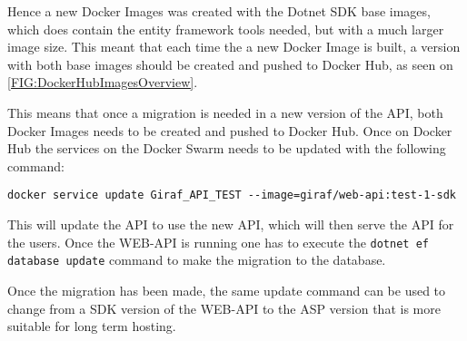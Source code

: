 Hence a new Docker Images was created with the Dotnet SDK base images, which does contain the entity framework tools needed, but with a much larger image size. 
This meant that each time the a new Docker Image is built, a version with both base images should be created and pushed to Docker Hub, as seen on \autoref{FIG:DockerHubImagesOverview}. 


This means that once a migration is needed in a new version of the API, both Docker Images needs to be created and pushed to Docker Hub. 
Once on Docker Hub the services on the Docker Swarm needs to be updated with the following command:

\lstinline$docker service update Giraf_API_TEST --image=giraf/web-api:test-1-sdk$

This will update the API to use the new API, which will then serve the API for the users.
Once the WEB-API is running one has to execute the \lstinline$dotnet ef database update$ command to make the migration to the database.

Once the migration has been made, the same update command can be used to change from a SDK version of the WEB-API to the ASP version that is more suitable for long term hosting.




